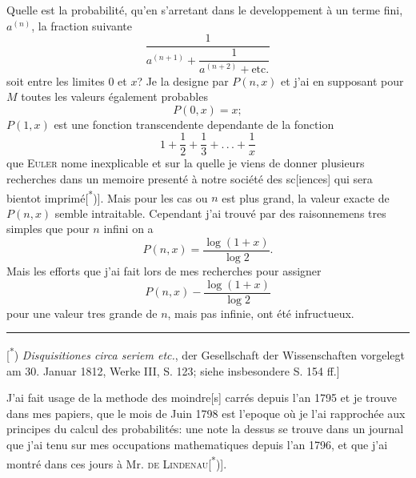 \indent Quelle est la probabilité, qu’en s’arretant dans le developpement à un terme fini, $a^{(n)}$, la fraction suivante
\[
\frac{1}{a^{(n+1)}+\dfrac{1}{a^{(n+2)}+\text{etc.}}}
\]
\noindent soit entre les limites 0 et $x$? Je la designe par $P(n,x)$ et j’ai en supposant pour $M$ toutes les valeurs également probables
\[
P(0,x)=x;
\]
\noindent $P(1,x)$ est une fonction transcendente dependante de la fonction
\[
1+\frac{1}{2}+\frac{1}{3}+{.}\,{.}\,{.}+\frac{1}{x}
\]
\noindent que \textsc{Euler} nome inexplicable et sur la quelle je viens de donner plusieurs recherches dans un memoire presenté à notre société des sc[iences] qui sera bientot imprimé[\textsuperscript{*})]. Mais pour les cas ou $n$ est plus grand, la valeur exacte de $P(n,x)$ semble intraitable. Cependant j’ai trouvé par des raisonnemens tres simples que pour $n$ infini on a
\[
P(n,x)=\frac{\log(1+x)}{\log 2}.
\]
\noindent Mais les efforts que j’ai fait lors de mes recherches pour assigner
\[
P(n,x)-\frac{\log(1+x)}{\log 2}
\]
\noindent pour une valeur tres grande de $n$, mais pas infinie, ont été infructueux.
\par\noindent{}\par
\medskip\noindent\rule{.24\linewidth}{.4pt}\par\smallskip
{\small
\noindent\hspace*{\parindent}[\textsuperscript{*}) \textit{Disquisitiones circa seriem etc.}, der Gesellschaft der Wissenschaften vorgelegt am 30. Januar 1812, Werke III, S. 123; siehe insbesondere S. 154 ff.]
\par}
\clearpage{}
\noindent\hspace*{\parindent}J’ai fait usage de la methode des moindre[s] carrés depuis l’an 1795 et je trouve dans mes papiers, que le mois de Juin 1798 est l’epoque où je l’ai rapprochée aux principes du calcul des probabilités: une note la dessus se trouve dans un journal que j’ai tenu sur mes occupations mathematiques depuis l’an 1796, et que j’ai montré dans ces jours à Mr. \textsc{de Lindenau}[\textsuperscript{*})].

